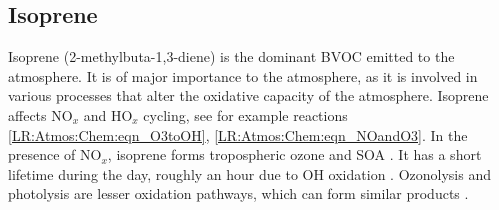     
    
    
    
    
    
    
  \subsection{Isoprene}
  \label{LR:VOCs:Isop}
    Isoprene (2-methylbuta-1,3-diene) is the dominant BVOC emitted to the atmosphere. 
    It is of major importance to the atmosphere, as it is involved in various processes that alter the oxidative capacity of the atmosphere.
    Isoprene affects NO$_x$ and HO$_x$ cycling, see for example reactions \ref{LR:Atmos:Chem:eqn_O3toOH}, \ref{LR:Atmos:Chem:eqn_NOandO3}.
    In the presence of NO$_x$, isoprene forms tropospheric ozone and SOA \parencite{Wagner2002,AtkinsonArey2003, Millet2006,Patchen2007}.
    It has a short lifetime during the day, roughly an hour due to OH oxidation \parencite{AtkinsonArey2003}.
    Ozonolysis and photolysis are lesser oxidation pathways, which can form similar products \parencite{Nguyen2016, Wolfe2016}.
    
